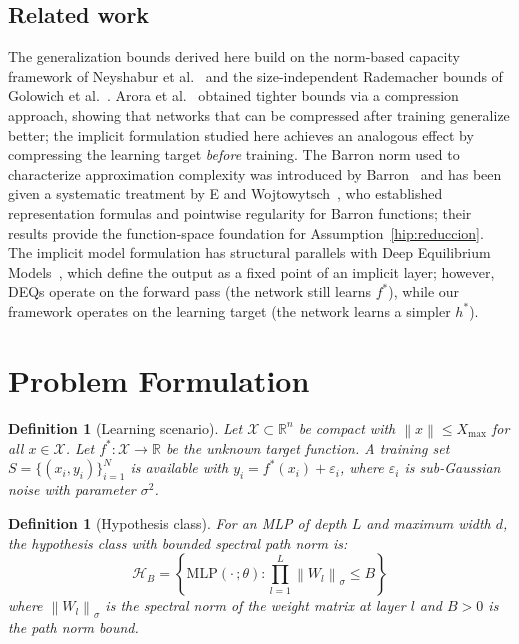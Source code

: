 \documentclass[12pt]{article}
\newtheorem{definition}[theorem]{Definition}
\newcommand{\R}{\mathbb{R}}
\newcommand{\MLP}{\mathrm{MLP}}
\newcommand{\norm}[1]{\left\|#1\right\|}
\begin{document}
\subsection{Related work}

The generalization bounds derived here build on the norm-based
capacity framework of Neyshabur et al.~\cite{Neyshabur2015} and the
size-independent Rademacher bounds of Golowich et
al.~\cite{Golowich2018}.
Arora et al.~\cite{Arora2018} obtained tighter bounds via a
compression approach, showing that networks that can be compressed
after training generalize better; the implicit formulation studied
here achieves an analogous effect by compressing the learning target
\emph{before} training.
The Barron norm used to characterize approximation complexity was
introduced by Barron~\cite{Barron1993} and has been given a
systematic treatment by E and Wojtowytsch~\cite{EWojtowytsch2022},
who established representation formulas and pointwise regularity
for Barron functions; their results provide the function-space
foundation for Assumption~\ref{hip:reduccion}.
The implicit model formulation has structural parallels with Deep
Equilibrium Models~\cite{Bai2019}, which define the output as a
fixed point of an implicit layer; however, DEQs operate on the
forward pass (the network still learns $f^*$), while our framework
operates on the learning target (the network learns a simpler
$h^*$).

\section{Problem Formulation}
\label{sec:formulation}

\begin{definition}[Learning scenario]
\label{def:scenario}
Let $\mathcal{X} \subset \R^n$ be compact with $\norm{x} \le X_{\max}$
for all $x \in \mathcal{X}$.
Let $f^*: \mathcal{X} \to \R$ be the unknown target function.
A training set $S = \{(x_i, y_i)\}_{i=1}^N$ is available with
$y_i = f^*(x_i) + \varepsilon_i$, where $\varepsilon_i$ is
sub-Gaussian noise with parameter $\sigma^2$.
\end{definition}

\begin{definition}[Hypothesis class]
\label{def:hypothesis}
For an MLP of depth $L$ and maximum width $d$, the hypothesis class
with bounded spectral path norm is:
\begin{equation}
  \mathcal{H}_B = \left\{ \MLP(\cdot\,;\theta) :
    \prod_{l=1}^{L} \norm{W_l}_\sigma \le B \right\}
\end{equation}
where $\norm{W_l}_\sigma$ is the spectral norm of the weight matrix
at layer $l$ and $B > 0$ is the path norm bound.
\end{definition}
\end{document}
